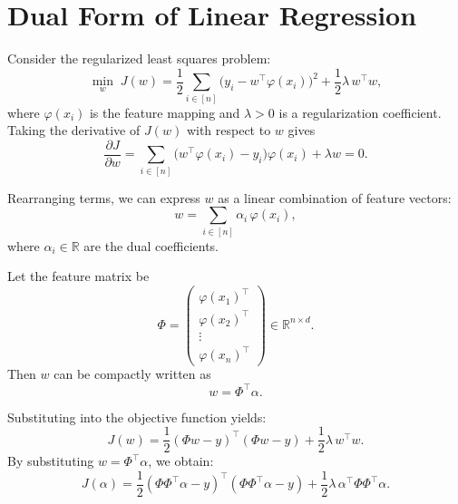 \documentclass[../main]{subfiles}
\begin{document}
\section{Dual Form of Linear Regression}
Consider the regularized least squares problem:
\begin{equation}
    \min_{w} \; J(w)
    = \frac{1}{2} \sum_{i \in [n]} \bigl(y_i - w^\top \varphi(x_i)\bigr)^2
    + \frac{1}{2}\lambda\, w^\top w,
\end{equation}
where $\varphi(x_i)$ is the feature mapping and $\lambda > 0$ is a regularization coefficient.
Taking the derivative of $J(w)$ with respect to $w$ gives
\begin{equation}
    \frac{\partial J}{\partial w}
    = \sum_{i \in [n]} \bigl(w^\top \varphi(x_i) - y_i\bigr)\varphi(x_i)
    + \lambda w = 0.
\end{equation}

Rearranging terms, we can express $w$ as a linear combination of feature vectors:
\begin{equation}
    w = \sum_{i \in [n]} \alpha_i\, \varphi(x_i),
\end{equation}
where $\alpha_i \in \mathbb{R}$ are the dual coefficients.

Let the feature matrix be
\begin{equation}
    \Phi =
    \begin{pmatrix}
        \varphi(x_1)^\top \\
        \varphi(x_2)^\top \\
        \vdots \\
        \varphi(x_n)^\top
    \end{pmatrix}
    \in \mathbb{R}^{n \times d}.
\end{equation}
Then $w$ can be compactly written as
\begin{equation}
    w = \Phi^\top \alpha.
\end{equation}

Substituting into the objective function yields:
\begin{equation}
    J(w)
    = \frac{1}{2} (\Phi w - y)^\top (\Phi w - y)
    + \frac{1}{2}\lambda\, w^\top w.
\end{equation}
By substituting $w = \Phi^\top \alpha$, we obtain:
\begin{equation}
    J(\alpha)
    = \frac{1}{2} (\Phi \Phi^\top \alpha - y)^\top (\Phi \Phi^\top \alpha - y)
    + \frac{1}{2}\lambda\, \alpha^\top \Phi \Phi^\top \alpha.
\end{equation}
\end{document}
